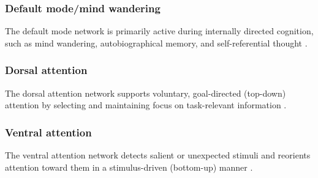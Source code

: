 \documentclass[a4paper]{article}
\begin{document}
         \subsubsection{Default mode/mind wandering}
            The default mode network is primarily active during internally directed cognition, such as mind wandering, autobiographical memory, and self-referential thought  \cite{mason-2007-wandering-minds-the-default-network-and-stimulus-independent-thought}.

         \subsubsection{Dorsal attention}
            The dorsal attention network supports voluntary, goal-directed (top-down) attention by selecting and maintaining focus on task-relevant information \cite{corbetta-2002-control-of-goal-directed-and-stimulus-driven-attention-in-the-brain, vossel-2014-dorsal-and-ventral-attention-systems, corbetta-2008-the-reorienting-system-of-the-human-brain-from-environment-to-theory-of-mind}.

         \subsubsection{Ventral attention}
            The ventral attention network detects salient or unexpected stimuli and reorients attention toward them in a stimulus-driven (bottom-up) manner \cite{scalf-2014-trial-history-effects-in-the-ventral-attentional-network}.

            

            

            

            
\end{document}
